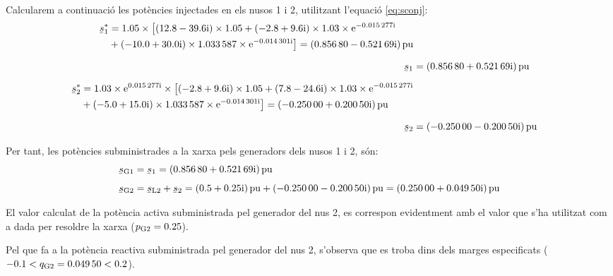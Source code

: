 \begin{exemple}
    Calcularem a continuació les potències injectades en els nusos 1 i
    2, utilitzant l'equació \eqref{eq:sconj}:
    \begin{align*}
    \begin{split}
    \cmplx{s}_1^* &= \num{1,05} \times\bigl[ (\complexnum{12,8-j39,6}) \times \num{1,05}
    +
    (\complexnum{-2,8+j9,6}) \times \num{1,03}\times\eu^{\complexnum{-j0,015277}}  \\
    &+ (\complexnum{-10,0+j30,0}) \times \num{1,033587}\times\eu^{\complexnum{-j0,014301}}
    \bigr] = \complexqty{0,85680 - j 0,52169}{pu}
    \end{split} \\[1.5ex]
    \cmplx{s}_1 &= \complexqty{0,85680 + j 0,52169}{pu} \\[1.5ex]
    \begin{split}
    \cmplx{s}_2^* &= \num{1,03} \times\eu^{\complexnum{j0,015277}} \times\bigl[
    (\complexnum{-2,8+j9,6}) \times \num{1,05} +
     (\complexnum{7,8-j24,6}) \times \num{1,03}\times\eu^{\complexnum{-j0,015277}} \\
    & + (\complexnum{-5,0+j15,0}) \times \num{1,033587}\times\eu^{\complexnum{-j0,014301}}
    \bigr] = \complexqty{-0,25000 + j 0,20050}{pu}
    \end{split} \\[1.5ex]
     \cmplx{s}_2 &= \complexqty{-0,25000 - j 0,20050}{pu}
    \end{align*}

    Per tant, les potències subministrades a la xarxa pels generadors
    dels nusos 1 i 2, són:
    \begin{align*}
    \cmplx{s}\ped{G1} &= \cmplx{s}_1 = \complexqty{0,85680 + j 0,52169}{pu} \\[1ex]
    \cmplx{s}\ped{G2} &= \cmplx{s}\ped{L2} + \cmplx{s}_2 = \complexqty{0,5 + j0,25}{pu} +
    \complexqty{-0,25000 - j 0,20050}{pu}  = \complexqty{0,25000 + j 0,04950}{pu}
    \end{align*}

    El valor calculat de la potència activa subministrada pel generador
    del nus 2, es
     correspon evidentment amb el valor que s'ha utilitzat com a dada per
    resoldre la xarxa ($p_\mathrm{G2}=\num{0,25}$).

    Pel que fa a la potència reactiva subministrada pel generador del
    nus 2, s'observa que es troba dins dels  marges especificats
    ($\num{-0,1}< q_\mathrm{G2}=\num{0,04950} <\num{0,2}$).
\end{exemple}


